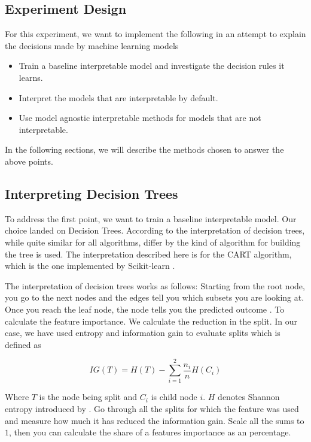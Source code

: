 \subsection{Experiment Design}

For this experiment, we want to implement the following in an attempt to explain the decisions made by machine learning models

\begin{itemize}
    \item Train a baseline interpretable model and investigate the decision rules it learns.
    \item Interpret the models that are interpretable by default.
    \item Use model agnostic interpretable methods for models that are not interpretable.
\end{itemize}

In the following sections, we will describe the methods chosen to answer the above points.

\subsection{Interpreting Decision Trees}

To address the first point, we want to train a baseline interpretable model. Our choice landed on Decision Trees. According to \citet{Molnar:2020:Book} the interpretation of decision trees, while quite similar for all algorithms, differ by the kind of algorithm for building the tree is used. The interpretation described here is for the CART algorithm, which is the one implemented by Scikit-learn \cite{Pedregosa:2011:JMLR}.

The interpretation of decision trees works as follows: Starting from the root node, you go to the next nodes and the edges tell you which subsets you are looking at. Once you reach the leaf node, the node tells you the predicted outcome \cite{Molnar:2020:Book}. To calculate the feature importance. We calculate the reduction in the split. In our case, we have used entropy and information gain to evaluate splits which is defined as 

\begin{equation*}
    IG(T) = H(T) - \sum_{i = 1}^{2} \frac{n_i}{n} H(C_i)
\end{equation*}

Where $T$ is the node being split and $C_i$ is child node $i$. $H$ denotes Shannon entropy introduced by \citet{Shannon:1948:BellSystTechJ}. Go through all the splits for which the feature was used and measure how much it has reduced the information gain. Scale all the sums to $1$, then you can calculate the share of a features importance as an percentage.

